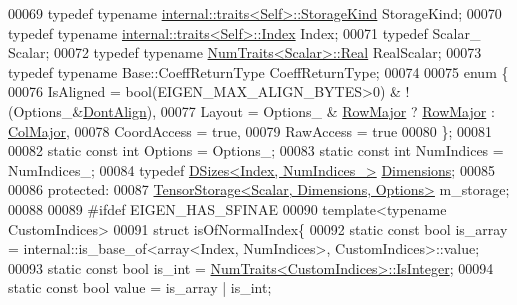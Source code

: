 \begin{DoxyCode}
00069     \textcolor{keyword}{typedef} \textcolor{keyword}{typename} \hyperlink{struct_eigen_1_1internal_1_1traits}{internal::traits<Self>::StorageKind} StorageKind;
00070     \textcolor{keyword}{typedef} \textcolor{keyword}{typename} \hyperlink{struct_eigen_1_1internal_1_1traits}{internal::traits<Self>::Index} Index;
00071     \textcolor{keyword}{typedef} Scalar\_ Scalar;
00072     \textcolor{keyword}{typedef} \textcolor{keyword}{typename} \hyperlink{group___core___module_struct_eigen_1_1_num_traits}{NumTraits<Scalar>::Real} RealScalar;
00073     \textcolor{keyword}{typedef} \textcolor{keyword}{typename} Base::CoeffReturnType CoeffReturnType;
00074 
00075     \textcolor{keyword}{enum} \{
00076       IsAligned = bool(EIGEN\_MAX\_ALIGN\_BYTES>0) & !(Options\_&\hyperlink{group__enums_ggaacded1a18ae58b0f554751f6cdf9eb13a40a452614141522dd313363dbbd65726}{DontAlign}),
00077       Layout = Options\_ & \hyperlink{group__enums_ggaacded1a18ae58b0f554751f6cdf9eb13acfcde9cd8677c5f7caf6bd603666aae3}{RowMajor} ? \hyperlink{group__enums_ggaacded1a18ae58b0f554751f6cdf9eb13acfcde9cd8677c5f7caf6bd603666aae3}{RowMajor} : \hyperlink{group__enums_ggaacded1a18ae58b0f554751f6cdf9eb13a0cbd4bdd0abcfc0224c5fcb5e4f6669a}{ColMajor},
00078       CoordAccess = \textcolor{keyword}{true},
00079       RawAccess = \textcolor{keyword}{true}
00080     \};
00081 
00082     \textcolor{keyword}{static} \textcolor{keyword}{const} \textcolor{keywordtype}{int} Options = Options\_;
00083     \textcolor{keyword}{static} \textcolor{keyword}{const} \textcolor{keywordtype}{int} NumIndices = NumIndices\_;
00084     \textcolor{keyword}{typedef} \hyperlink{struct_eigen_1_1_d_sizes}{DSizes<Index, NumIndices\_>} \hyperlink{struct_eigen_1_1_d_sizes}{Dimensions};
00085 
00086   \textcolor{keyword}{protected}:
00087     \hyperlink{class_eigen_1_1_tensor_storage}{TensorStorage<Scalar, Dimensions, Options>} m\_storage;
00088 
00089 \textcolor{preprocessor}{#ifdef EIGEN\_HAS\_SFINAE}
00090     \textcolor{keyword}{template}<\textcolor{keyword}{typename} CustomIndices>
00091     \textcolor{keyword}{struct }isOfNormalIndex\{
00092       \textcolor{keyword}{static} \textcolor{keyword}{const} \textcolor{keywordtype}{bool} is\_array = internal::is\_base\_of<array<Index, NumIndices>, CustomIndices>::value;
00093       \textcolor{keyword}{static} \textcolor{keyword}{const} \textcolor{keywordtype}{bool} is\_int = \hyperlink{group___core___module_struct_eigen_1_1_num_traits}{NumTraits<CustomIndices>::IsInteger};
00094       \textcolor{keyword}{static} \textcolor{keyword}{const} \textcolor{keywordtype}{bool} value = is\_array | is\_int;

\end{DoxyCode}
